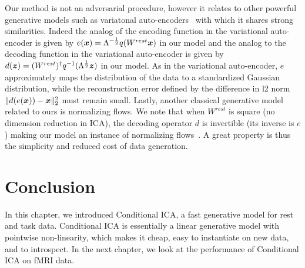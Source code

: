 Our method is not an adversarial procedure, however it relates to other
powerful generative models such as variatonal
auto-encoders~\cite{kingma2013auto} with which it shares strong similarities.
Indeed the analog of the encoding function in the variational auto-encoder is
given by $e(\boldsymbol{x}) = \Lambda^{-\frac12}q(W^{rest} \boldsymbol{x})$ in our model and the analog to the decoding
function in the variational auto-encoder is given by $d(\boldsymbol{z}) =
(W^{rest})^{\dagger}q^{-1}(\Lambda^{\frac12}\boldsymbol{z})$ in our model. As in the variational auto-encoder, $e$ approximately maps the distribution of the data to a standardized Gaussian distribution,
while the reconstruction error defined by the difference in l2 norm
$\|d(e(\boldsymbol{x})) - \boldsymbol{x}\|^2_2$ must remain small.
Lastly, another classical generative model related to ours is normalizing
flows.  We note that when $W^{rest}$ is square (no dimension reduction in ICA), the decoding operator $d$ is invertible (its inverse is $e$) making our
model an instance of normalizing flows~\cite{rezende2015variational}. 
%
A great property is thus the simplicity and reduced cost of data generation.

\section{Conclusion}
In this chapter, we introduced Conditional ICA, a fast generative model for rest
and task data. Conditional ICA is essentially a linear generative model with
pointwise non-linearity, which makes it cheap, easy to instantiate on new data,
and to introspect.
In the next chapter, we look at the performance of Conditional ICA on fMRI data.

